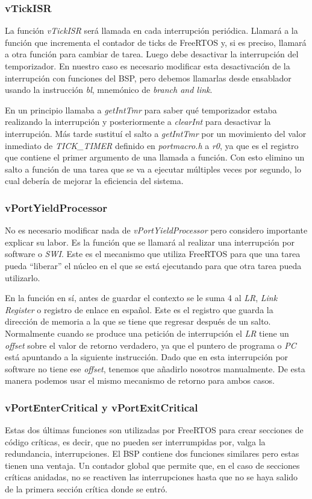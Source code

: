 \subsubsection{vTickISR}
La función \emph{vTickISR} será llamada en cada interrupción periódica. Llamará a la función que incrementa el contador de ticks de FreeRTOS y, si es preciso, llamará a otra función para cambiar de tarea. Luego debe desactivar la interrupción del temporizador. En nuestro caso es necesario modificar esta desactivación de la interrupción con funciones del BSP, pero debemos llamarlas desde ensablador usando la instrucción \emph{bl}, mnemónico de \emph{branch and link}.

En un principio llamaba a \emph{getIntTmr} para saber qué temporizador estaba realizando la interrupción y posteriormente a \emph{clearInt} para desactivar la interrupción. Más tarde sustituí el salto a \emph{getIntTmr} por un movimiento del valor inmediato de \emph{TICK\_TIMER} definido en \emph{portmacro.h} a \emph{r0}, ya que es el registro que contiene el primer argumento de una llamada a función. Con esto elimino un salto a función de una tarea que se va a ejecutar múltiples veces por segundo, lo cual debería de mejorar la eficiencia del sistema.

\subsubsection{vPortYieldProcessor}
No es necesario modificar nada de \emph{vPortYieldProcessor} pero considero importante explicar su labor. Es la función que se llamará al realizar una interrupción por software o \emph{SWI}. Este es el mecanismo que utiliza FreeRTOS para que una tarea pueda ``liberar'' el núcleo en el que se está ejecutando para que otra tarea pueda utilizarlo.

En la función en sí, antes de guardar el contexto se le suma 4 al \emph{LR}, \emph{Link Register} o registro de enlace en español. Este es el registro que guarda la dirección de memoria a la que se tiene que regresar después de un salto. Normalmente cuando se produce una petición de interrupción el \emph{LR} tiene un \emph{offset} sobre el valor de retorno verdadero, ya que el puntero de programa o \emph{PC} está apuntando a la siguiente instrucción. Dado que en esta interrupción por software no tiene ese \emph{offset}, tenemos que añadirlo nosotros manualmente. De esta manera podemos usar el mismo mecanismo de retorno para ambos casos.

\subsubsection{vPortEnterCritical y vPortExitCritical}
Estas dos últimas funciones son utilizadas por FreeRTOS para crear secciones de código críticas, es decir, que no pueden ser interrumpidas por, valga la redundancia, interrupciones. El BSP contiene dos funciones similares pero estas tienen una ventaja. Un contador global que permite que, en el caso de secciones críticas anidadas, no se reactiven las interrupciones hasta que no se haya salido de la primera sección crítica donde se entró.

